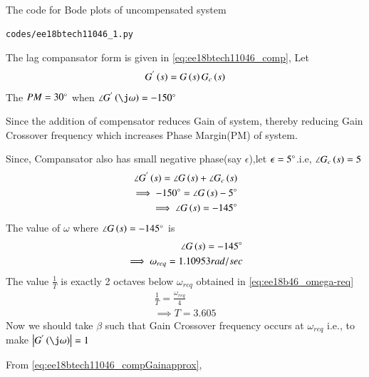The code for Bode plots of uncompensated system 
\begin{lstlisting}
codes/ee18btech11046_1.py
\end{lstlisting}
% 



The lag compansator form is given in  \eqref{eq:ee18btech11046_comp},
Let
\begin{align}
G^{'}\left(s\right)=G\left(s\right)G_{c}\left(s\right)
\end{align}
The $PM = 30\degree$ when $\angle G^{'}\brak{\j\omega} = -150\degree$ 

Since the addition of compensator reduces Gain of system, thereby reducing Gain Crossover frequency which increases Phase Margin(PM) of system.

Since, Compansator also has small negative phase(say $\epsilon$),let $\epsilon =5\degree$.i.e, $\angle G_{c}\left(s\right) = 5$ 
\begin{align}
\angle G^{'}\left(s\right) = \angle G\left(s\right) + \angle G_{c}\left(s\right)
\\
\implies
-150\degree = \angle G\left(s\right) - 5\degree
\\
\implies
\angle G\left(s\right) = -145\degree
\end{align}
The value of $\omega$ where $\angle G\left(s\right) = -145\degree$ is 
\begin{align}
\angle G\left(s\right) = -145\degree
\\
\implies
\omega_{req} = 1.10953rad/sec
\label{eq:ee18b46_omega-req}
\end{align}
The value $\frac{1}{T}$ is exactly 2 octaves below $\omega_{req}$ obtained in \eqref{eq:ee18b46_omega-req}
\begin{align}
\frac{1}{T} = \frac{\omega_{req}}{4}
\\
\implies
T = 3.605
\label{eq:ee18btech11046_T}
\end{align}
Now we should take $\beta$ such that Gain Crossover frequency occurs at $\omega_{req}$ i.e., to make $\abs{G^{'}\brak{\j\omega}} = 1$

From \eqref{eq:ee18btech11046_compGainapprox},


